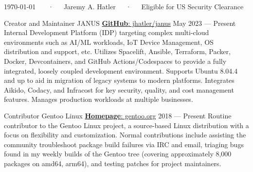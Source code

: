 \documentclass[11pt, letterpaper]{awesome-cv}
\begin{document}
\makecvheader[C]

\makecvfooter
  {\today}
  {~~~·~~~Jaremy A. Hatler~~~·~~~Eligible for US Security Clearance}
  {\thepage}






\begin{cventries}
    \cventry
        { Creator and Maintainer }
        { JANUS }
        { \href{https://github.com/jhatler/janus}{\textbf{GitHub}: jhatler/janus}
 }
        { May 2023 --- Present }
        {
          Internal Development Platform (IDP) targeting complex multi-cloud environments such as AI/ML workloads, IoT Device Management, OS distribution and support, etc. Utilizes Spacelift, Ansible, Terraform, Packer, Docker, Devcontainers, and GitHub Actions/Codespaces to provide a fully integrated, loosely coupled development environment. Supports Ubuntu 8.04.4 and up to aid in migration of legacy systems to modern platforms. Integrates Aikido, Codacy, and Infracost for key security, quality, and cost management features. Manages production workloads at multiple businesses.
        }
\end{cventries}
\begin{cventries}
    \cventry
        { Contributor }
        { Gentoo Linux }
        { \href{https://www.gentoo.org/}{\textbf{Homepage}: gentoo.org}
 }
        { 2018 --- Present }
        {
          Routine contributor to the Gentoo Linux project, a source-based Linux distribution with a focus on flexibility and customization. Normal contributions include assisting the community troubleshoot package build failures via IRC and email, triaging bugs found in my weekly builds of the Gentoo tree (covering approximately 8,000 packages on amd64, arm64), and testing patches for project maintainers.
        }
\end{cventries}




\end{document}
